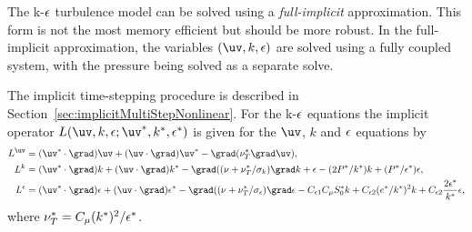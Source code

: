   The k-$\epsilon$ turbulence model can be solved using a {\em full-implicit} approximation.
This form is not the most memory efficient but should be more robust. 
In the full-implicit approximation, the variables $(\uv,k,\eps)$ are solved using
a fully coupled system, with the pressure being solved as a separate solve.

The implicit time-stepping procedure is described in Section~\ref{sec:implicitMultiStepNonlinear}.
For the k-$\epsilon$ equations the implicit operator $L(\uv, k,\eps; \uv^*, k^*,\eps^*)$ is given for the $\uv$, $k$ and $\epsilon$ equations
by 
\begin{align*}
  L^\uv &= (\uv^*\cdot\grad)\uv + (\uv\cdot\grad)\uv^* - \grad(\nu_T^*\grad\uv) , \\ 
  L^k &=  (\uv^*\cdot\grad)k + (\uv\cdot\grad)k^* - \grad((\nu + \nu_T^*/\sigma_k)\grad k + \eps - (2 P^{*}/k^*)k + (P^*/\eps^*)\eps,  \\
  L^\eps &= (\uv^*\cdot\grad)\eps +  (\uv\cdot\grad)\eps^* - \grad((\nu + \nu_T^*/\sigma_\eps)\grad \eps 
                 - C_{\eps 1} C_\mu S_0^* k + C_{\eps 2} (e^*/k^*)^2 k + C_{\eps 2} \frac{2\eps^*}{k^*} \eps ,
\end{align*}
where $\nu_T^* =C_\mu (k^*)^2/\epsilon^* $. 
% 
% 
% 
